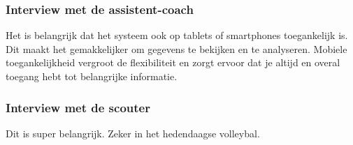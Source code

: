\begin{enumerate}
  \subsubsection{Interview met de assistent-coach}
  Het is belangrijk dat het systeem ook op tablets of smartphones toegankelijk is. Dit maakt het gemakkelijker om gegevens te bekijken en te analyseren. Mobiele toegankelijkheid vergroot de flexibiliteit en zorgt ervoor dat je altijd en overal toegang hebt tot belangrijke informatie.
  \subsubsection{Interview met de scouter}
  Dit is super belangrijk. Zeker in het hedendaagse volleybal.
\end{enumerate}

